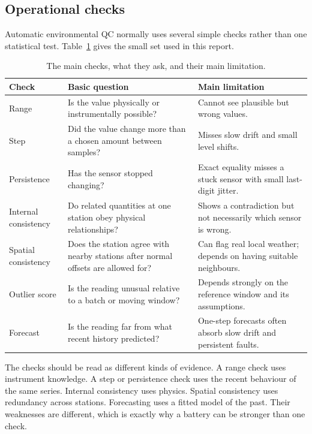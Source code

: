 \subsection{Operational checks}

Automatic environmental QC normally uses several simple checks rather than
one statistical test. Table~\ref{tab:checks} gives the small set used in this
report.

\begin{table}[h]
\centering
\small
\caption{The main checks, what they ask, and their main limitation.}
\label{tab:checks}
\begin{tabular}{@{}p{2.7cm}p{5.2cm}p{6.0cm}@{}}
\toprule
Check & Basic question & Main limitation \\
\midrule
Range & Is the value physically or instrumentally possible? & Cannot see plausible but wrong values. \\
Step & Did the value change more than a chosen amount between samples? & Misses slow drift and small level shifts. \\
Persistence & Has the sensor stopped changing? & Exact equality misses a stuck sensor with small last-digit jitter. \\
Internal consistency & Do related quantities at one station obey physical relationships? & Shows a contradiction but not necessarily which sensor is wrong. \\
Spatial consistency & Does the station agree with nearby stations after normal offsets are allowed for? & Can flag real local weather; depends on having suitable neighbours. \\
Outlier score & Is the reading unusual relative to a batch or moving window? & Depends strongly on the reference window and its assumptions. \\
Forecast & Is the reading far from what recent history predicted? & One-step forecasts often absorb slow drift and persistent faults. \\
\bottomrule
\end{tabular}
\end{table}

The checks should be read as different kinds of evidence. A range check uses
instrument knowledge. A step or persistence check uses the recent behaviour
of the same series. Internal consistency uses physics. Spatial consistency
uses redundancy across stations. Forecasting uses a fitted model of the
past. Their weaknesses are different, which is exactly why a battery can be
stronger than one check.


